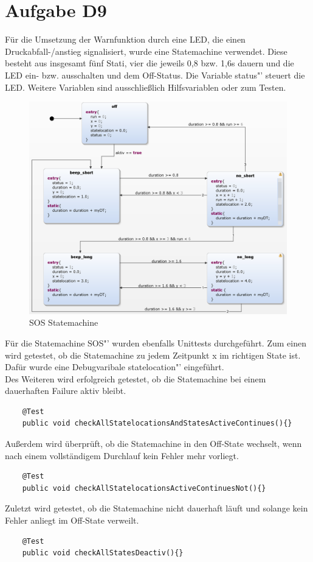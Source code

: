 \chapter{Aufgabe D9}
Für die Umsetzung der Warnfunktion durch eine LED, die einen Druckabfall-/anstieg signalisiert, wurde eine Statemachine verwendet. Diese besteht aus insgesamt fünf Stati, vier die jeweils 0,8 bzw. 1,6s dauern und die LED ein- bzw. ausschalten und dem Off-Status.
Die Variable \glqq status"' steuert die LED. Weitere Variablen sind ausschließlich Hilfsvariablen oder zum Testen.

\begin{figure}[h!]
	\centering
	\includegraphics[width=1\linewidth]{../Graphiken/SOS_state.png}
	\caption{SOS Statemachine}
	\label{fig:SOS_state}
\end{figure}
Für die Statemachine \glqq SOS"' wurden ebenfalls Unittests durchgeführt. Zum einen wird getestet, ob die Statemachine zu jedem Zeitpunkt x im richtigen State ist. Dafür wurde eine Debugvaribale \glqq statelocation"' eingeführt.\\
Des Weiteren wird erfolgreich getestet, ob die Statemachine bei einem dauerhaften Failure aktiv bleibt.
\begin{lstlisting}
	@Test
    public void checkAllStatelocationsAndStatesActiveContinues(){}
  \end{lstlisting}
  
  
  Außerdem wird überprüft, ob die Statemachine in den Off-State wechselt, wenn nach einem vollständigem Durchlauf kein Fehler mehr vorliegt.
\begin{lstlisting}
    @Test
    public void checkAllStatelocationsActiveContinuesNot(){}
   \end{lstlisting} 
   
   
  Zuletzt wird getestet, ob die Statemachine nicht dauerhaft läuft und solange kein Fehler anliegt im Off-State verweilt.
   \begin{lstlisting}
    @Test
    public void checkAllStatesDeactiv(){}
\end{lstlisting}